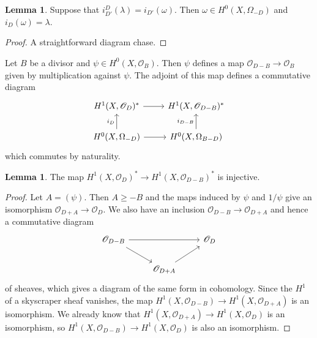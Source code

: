 \documentclass[12pt]{book}
\newcommand{\Olo}{\mathscr O}
\theoremstyle{definition}
\newtheorem{lemma}[theorem]{Lemma}
\begin{document}
\begin{lemma}
\label{Serre theorem 4}
Suppose that $i_{D'}^D(\lambda) = i_{D'}(\omega)$. Then $\omega \in H^0(X, \Omega_{-D})$ and $i_D(\omega) = \lambda$.
\end{lemma}
\begin{proof}
A straightforward diagram chase.
\end{proof}

Let $B$ be a divisor and $\psi \in H^0(X, \Olo_B)$.
Then $\psi$ defines a map $\Olo_{D - B} \to \Olo_B$ given by multiplication against $\psi$.
The adjoint of this map defines a commutative diagram
$$\begin{tikzcd}
H^1(X, \Olo_D)^* \arrow[r] & H^1(X, \Olo_{D - B})^*\\
H^0(X, \Omega_{-D}) \arrow[u,"i_D"] \arrow[r] & H^0(X, \Omega_{B - D}) \arrow[u,"i_{D - B}"]
\end{tikzcd}$$
which commutes by naturality.

\begin{lemma}
\label{Serre theorem 5}
The map $H^1(X, \Olo_D)^* \to H^1(X, \Olo_{D - B})^*$ is injective.
\end{lemma}
\begin{proof}
Let $A = (\psi)$.
Then $A \geq -B$ and the maps induced by $\psi$ and $1/\psi$ give an isomorphism $\Olo_{D+A} \to \Olo_D$.
We also have an inclusion $\Olo_{D - B} \to \Olo_{D + A}$ and hence a commutative diagram
$$\begin{tikzcd}
\Olo_{D - B} \arrow[rr] \arrow[dr] && \Olo_D\\
& \Olo_{D + A} \arrow[ur]
\end{tikzcd}$$
of sheaves, which gives a diagram of the same form in cohomology.
Since the $H^1$ of a skyscraper sheaf vanishes, the map $H^1(X, \Olo_{D - B}) \to H^1(X, \Olo_{D + A})$ is an isomorphism. We already know that $H^1(X, \Olo_{D + A}) \to H^1(X, \Olo_D)$ is an isomorphism, so $H^1(X, \Olo_{D - B}) \to H^1(X, \Olo_D)$ is also an isomorphism.
\end{proof}
\end{document}
